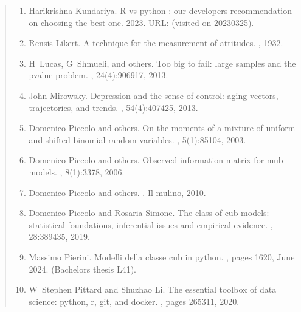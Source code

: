 \documentclass[letterpaper,10pt,english]{sphinxmanual}
\begin{document}
\begin{quote}
\begin{enumerate}
\item {} 
\sphinxAtStartPar
Harikrishna Kundariya. R vs python : our developers recommendation on choosing the best one. 2023. URL:  (visited on 2023\sphinxhyphen{}03\sphinxhyphen{}25).

\item {} 
\sphinxAtStartPar
Rensis Likert. A technique for the measurement of attitudes. , 1932.

\item {} 
\sphinxAtStartPar
H Lucas, G Shmueli, and others. Too big to fail: large samples and the p\sphinxhyphen{}value problem. , 24(4):906\textendash{}917, 2013.

\item {} 
\sphinxAtStartPar
John Mirowsky. Depression and the sense of control: aging vectors, trajectories, and trends. , 54(4):407\textendash{}425, 2013.

\item {} 
\sphinxAtStartPar
Domenico Piccolo and others. On the moments of a mixture of uniform and shifted binomial random variables. , 5(1):85\textendash{}104, 2003.

\item {} 
\sphinxAtStartPar
Domenico Piccolo and others. Observed information matrix for mub models. , 8(1):33\textendash{}78, 2006.

\item {} 
\sphinxAtStartPar
Domenico Piccolo and others. . Il mulino, 2010.

\item {} 
\sphinxAtStartPar
Domenico Piccolo and Rosaria Simone. The class of cub models: statistical foundations, inferential issues and empirical evidence. , 28:389\textendash{}435, 2019.

\item {} 
\sphinxAtStartPar
Massimo Pierini. Modelli della classe cub in python. , pages 16\textendash{}20, June 2024. (Bachelor\textquotesingle{}s thesis L\sphinxhyphen{}41).

\item {} 
\sphinxAtStartPar
W Stephen Pittard and Shuzhao Li. The essential toolbox of data science: python, r, git, and docker. , pages 265\textendash{}311, 2020.


\end{enumerate}
\end{quote}
\end{document}
